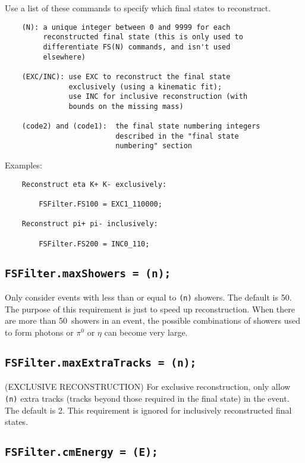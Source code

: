 \documentclass[11pt]{article}
\begin{document}
Use a list of these commands to specify which final states to reconstruct.
\begin{verbatim}
    (N): a unique integer between 0 and 9999 for each 
         reconstructed final state (this is only used to 
         differentiate FS(N) commands, and isn't used
         elsewhere)

    (EXC/INC): use EXC to reconstruct the final state 
               exclusively (using a kinematic fit);
               use INC for inclusive reconstruction (with 
               bounds on the missing mass)

    (code2) and (code1):  the final state numbering integers 
                          described in the "final state 
                          numbering" section
\end{verbatim}
Examples:
\begin{verbatim}
    Reconstruct eta K+ K- exclusively:

        FSFilter.FS100 = EXC1_110000;

    Reconstruct pi+ pi- inclusively:

        FSFilter.FS200 = INC0_110;
\end{verbatim}


\subsection{\tt FSFilter.maxShowers = (n);}

Only consider events with less than or equal to {\tt (n)} showers.  The default is 50.  The purpose of this requirement is just to speed up reconstruction.  When there are more than 50~showers in an event, the possible combinations of showers used to form photons or $\pi^0$ or $\eta$ can become very large.


\subsection{\tt FSFilter.maxExtraTracks = (n);}

(EXCLUSIVE RECONSTRUCTION) For exclusive reconstruction, only allow {\tt (n)} extra tracks (tracks beyond those required in the final state) in the event.  The default is 2.  This requirement is ignored for inclusively reconstructed final states.


\subsection{\tt FSFilter.cmEnergy = (E);}
\end{document}

